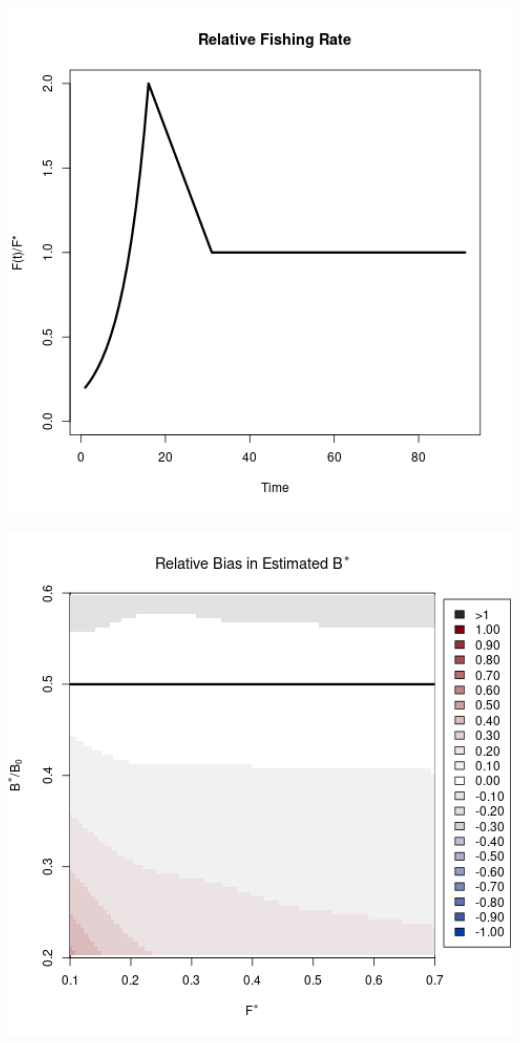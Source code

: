 \documentclass[ xcolor = pdftex, dvipsnames, table ]{beamer}
\begin{document}
\begin{frame}
\begin{minipage}[h!]{0.325\textwidth}
\hspace*{-0.75cm}
\includegraphics[width=1.1\textwidth]{../../.././nick/gpBias/rfExpT90X2Z0.6.png}
\end{minipage}
\begin{minipage}[h!]{0.325\textwidth}
\hspace*{-0.25cm}
\includegraphics[width=1.1\textwidth]{../../.././nick/gpBias/bMSYRelBiasPellaExpT45.png}\\

\end{minipage}
\end{frame}
\end{document}
